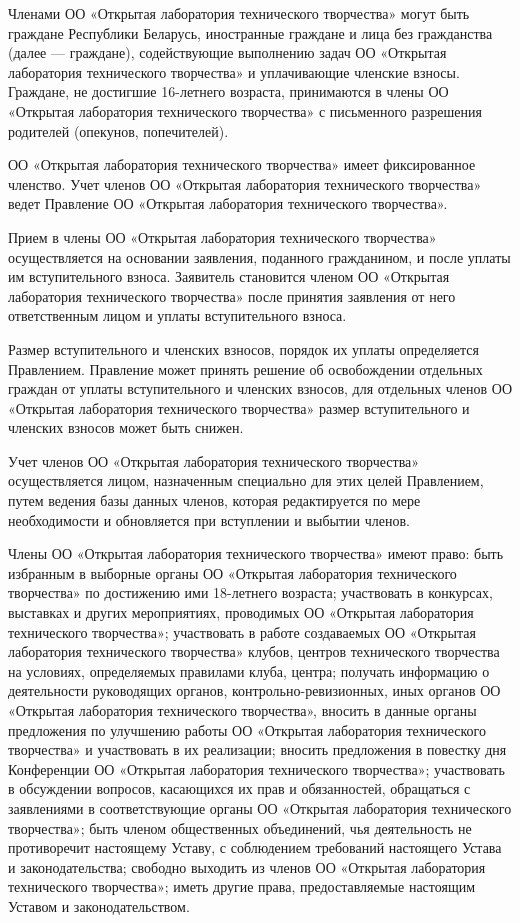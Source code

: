 \documentclass[a4paper,14pt,titlepage]{extarticle}
\begin{document}
Членами ОО «Открытая лаборатория технического творчества» могут быть граждане Республики Беларусь, иностранные граждане
и лица без гражданства (далее — граждане), содействующие выполнению задач ОО «Открытая лаборатория технического
творчества» и уплачивающие членские взносы. Граждане, не достигшие 16-летнего возраста, принимаются в члены ОО «Открытая
лаборатория технического творчества» с письменного разрешения родителей (опекунов, попечителей).

ОО «Открытая лаборатория технического творчества» имеет фиксированное членство. Учет членов ОО «Открытая лаборатория
технического творчества» ведет Правление ОО «Открытая лаборатория технического творчества».

Прием в члены ОО «Открытая лаборатория технического творчества» осуществляется на основании заявления, поданного
гражданином, и после уплаты им вступительного взноса. Заявитель становится членом ОО «Открытая лаборатория технического
творчества» после принятия заявления от него ответственным лицом и уплаты вступительного взноса.

Размер вступительного и членских взносов, порядок их уплаты определяется Правлением. Правление может принять решение об
освобождении отдельных граждан от уплаты вступительного и членских взносов, для отдельных членов ОО «Открытая
лаборатория технического творчества» размер вступительного и членских взносов может быть снижен.

Учет членов ОО «Открытая лаборатория технического творчества» осуществляется лицом, назначенным специально для этих
целей Правлением, путем ведения базы данных членов, которая редактируется по мере необходимости и обновляется при
вступлении и выбытии членов.

Члены ОО «Открытая лаборатория технического творчества» имеют право:
быть избранным в выборные органы ОО «Открытая лаборатория технического творчества» по достижению ими 18-летнего
возраста;
участвовать в конкурсах, выставках и других мероприятиях, проводимых ОО «Открытая лаборатория технического творчества»;
участвовать в работе создаваемых ОО «Открытая лаборатория технического творчества» клубов, центров технического
творчества на условиях, определяемых правилами клуба, центра;
получать информацию о деятельности руководящих органов, контрольно-ревизионных, иных органов ОО «Открытая лаборатория
технического творчества», вносить в данные органы предложения по улучшению работы ОО «Открытая лаборатория технического
творчества» и участвовать в их реализации;
вносить предложения в повестку дня Конференции ОО «Открытая лаборатория технического творчества»;
участвовать в обсуждении вопросов, касающихся их прав и обязанностей, обращаться с заявлениями в соответствующие органы
ОО «Открытая лаборатория технического творчества»;
быть членом общественных объединений, чья деятельность не противоречит настоящему Уставу, с соблюдением требований
настоящего Устава и законодательства;
свободно выходить из членов ОО «Открытая лаборатория технического творчества»;
иметь другие права, предоставляемые настоящим Уставом и законодательством.
\end{document}
